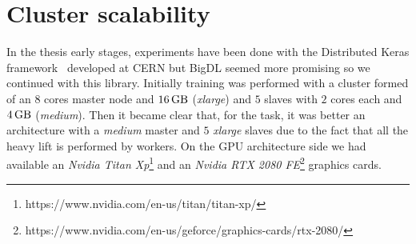 
\chapter{Cluster scalability}
In the thesis early stages, experiments have been done with the Distributed
Keras framework~\cite{distkeras} developed at CERN
but BigDL seemed more promising so we continued with this library.
Initially training was performed with a cluster formed of an $8$ cores master node and
$\SI{16}{\giga\byte}$ (\textit{xlarge}) and $5$ slaves with $2$ cores each
and $\SI{4}{\giga\byte}$ (\textit{medium}). Then it became clear
that, for the task, it was better an architecture with a \textit{medium} master and $5$
\textit{xlarge} slaves due to the fact that all the heavy lift is performed by workers.
On the GPU architecture side we had available an \textit{Nvidia Titan
 Xp}\footnote{https://www.nvidia.com/en-us/titan/titan-xp/} and an \textit{Nvidia RTX 2080
 FE}\footnote{https://www.nvidia.com/en-us/geforce/graphics-cards/rtx-2080/} graphics
cards.

